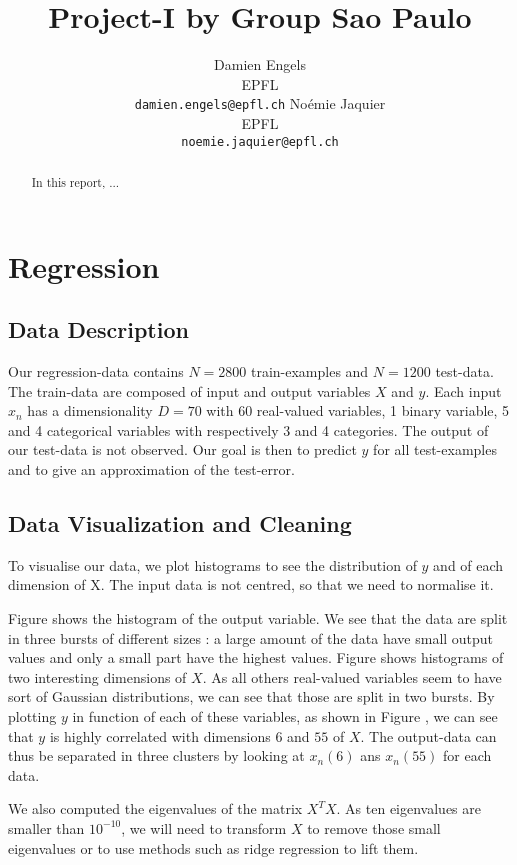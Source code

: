 \documentclass{article} %
\title{Project-I by Group Sao Paulo}
\author{
Damien Engels\\
EPFL \\
\texttt{damien.engels@epfl.ch} \And No\'emie Jaquier\\
EPFL \\
\texttt{noemie.jaquier@epfl.ch} \\
}
\begin{document}
\maketitle

\begin{abstract}
In this report, ...
\end{abstract}

\section{Regression}
\subsection{Data Description}
Our regression-data contains $N=2800$ train-examples and $N=1200$ test-data. The train-data are composed of input and output variables $X$ and $y$. Each input $x_n$ has a dimensionality $D=70$ with 60 real-valued variables, 1 binary variable, 5 and 4 categorical variables with respectively 3 and 4 categories. The output of our test-data is not observed. Our goal is then to predict $y$ for all test-examples and to give an approximation of the test-error.

\subsection{Data Visualization and Cleaning}
To visualise our data, we plot histograms to see the distribution of $y$ and of each dimension of X. The input data is not centred, so that we need to normalise it. 

Figure  shows the histogram of the output variable. We see that the data are split in three bursts of different sizes : a large amount of the data have small output values and only a small part have the highest values. Figure  shows histograms of two interesting dimensions of $X$. As all others real-valued variables seem to have sort of Gaussian distributions, we can see that those are split in two bursts. By plotting $y$ in function of each of these variables, as shown in Figure , we can see that $y$ is highly correlated with dimensions $6$ and $55$ of $X$. The output-data can thus be separated in three clusters by looking at $x_n(6)$ ans $x_n(55)$ for each data.

We also computed the eigenvalues of the matrix $X^T X$. As ten eigenvalues are smaller than $10^{-10}$, we will need to transform $X$ to remove those small eigenvalues or to use methods such as ridge regression to lift them. 
\end{document}
